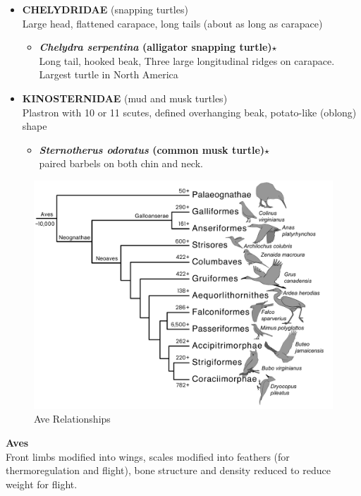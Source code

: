 \documentclass[a4paper,12pt]{article}
\begin{document}
\begin{description}
\begin{itemize}
\begin{itemize}
\begin{itemize}
    \end{itemize}
    \item {\textbf{CHELYDRIDAE} (snapping turtles)} \\ Large head, flattened carapace, long tails (about as long as carapace)
    \begin{itemize}
      \item{\textbf{\textit{Chelydra serpentina} (alligator snapping turtle)$\star$}} \\ Long tail, hooked beak, Three large longitudinal ridges on carapace. Largest turtle in North America
    \end{itemize}
    \item {\textbf{KINOSTERNIDAE} (mud and musk turtles)} \\ Plastron with 10 or 11 scutes, defined overhanging beak, potato-like (oblong) shape
    \begin{itemize}
      \item{\textbf{\textit{Sternotherus odoratus} (common musk turtle)$\star$}} \\ paired barbels on both chin and neck. 
    \end{itemize}
  \end{itemize}
\end{itemize}


\begin{figure}[H]
\centering
  \includegraphics[scale=0.3]{Aves_tre.pdf}
  \caption{Ave Relationships}
  \label{fig:Aves}
\end{figure}

\item\textbf{Aves} \\ Front limbs modified into wings, scales modified into feathers (for thermoregulation and flight), bone structure and density reduced to reduce weight for flight.


\end{description}
\end{document}
